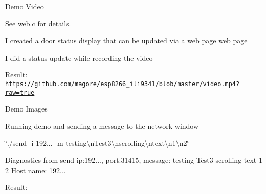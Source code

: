 \begin{DoxyParagraph}{Demo Video}

\begin{DoxyItemize}
\item See \hyperlink{web_8c}{web.\+c} for details.
\begin{DoxyItemize}
\item I created a door status display that can be updated via a web page web page
\item I did a status update while recording the video
\item Result\+: \href{https://github.com/magore/esp8266_ili9341/blob/master/video.mp4?raw=true}{\tt https\+://github.\+com/magore/esp8266\+\_\+ili9341/blob/master/video.\+mp4?raw=true}
\end{DoxyItemize}
\end{DoxyItemize}
\end{DoxyParagraph}
\begin{DoxyParagraph}{Demo Images}

\begin{DoxyItemize}
\item Running demo and sending a message to the network window
\item \char`\"{}./send -\/i 192... -\/m \textquotesingle{}testing\textbackslash{}n\+Test3\textbackslash{}nscrolling\textbackslash{}ntext\textbackslash{}n1\textbackslash{}n2\textquotesingle{}\char`\"{}
\begin{DoxyItemize}
\item Diagnostics from send ip\+:192..., port\+:31415, message\+: testing Test3 scrolling text 1 2 Host name\+: 192...
\begin{DoxyItemize}
\item Result\+:  
\end{DoxyItemize}
\end{DoxyItemize}
\end{DoxyItemize}
\end{DoxyParagraph}
